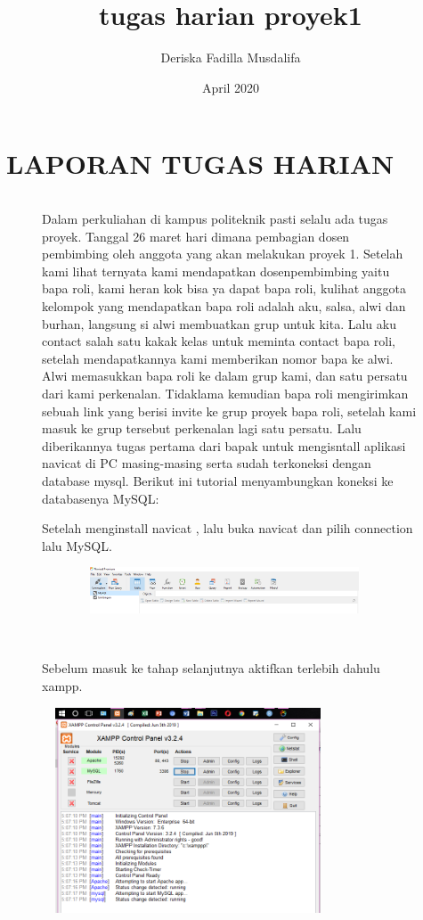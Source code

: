 \documentclass{book}
\title{tugas harian proyek1}
\author{Deriska Fadilla Musdalifa}
\date{April 2020}
\begin{document}
\maketitle
\thispagestyle{empty}

\newpage
\setcounter{page}{1}
\renewcommand{\partname}{PROYEK 1}
\part {LAPORAN TUGAS HARIAN}

\begin{enumerate}
\begin{figure} [ht]
\paragraph{} \quad Dalam perkuliahan di kampus politeknik pasti selalu ada tugas proyek. Tanggal 26 maret hari dimana pembagian dosen pembimbing oleh anggota yang akan melakukan proyek 1. Setelah kami lihat ternyata kami mendapatkan dosenpembimbing yaitu bapa roli, kami heran kok bisa ya dapat bapa roli, kulihat anggota kelompok yang mendapatkan bapa roli adalah aku, salsa, alwi dan burhan, langsung si alwi membuatkan grup untuk kita. Lalu aku contact salah satu kakak kelas untuk meminta contact bapa roli, setelah mendapatkannya kami memberikan nomor bapa ke alwi. Alwi memasukkan bapa roli ke dalam grup kami, dan satu persatu dari kami perkenalan. Tidaklama kemudian bapa roli mengirimkan sebuah link yang berisi invite ke grup proyek bapa roli, setelah kami masuk ke grup tersebut perkenalan lagi satu persatu. Lalu diberikannya tugas pertama dari bapak untuk mengisntall aplikasi navicat di PC masing-masing serta sudah terkoneksi dengan database mysql. Berikut ini tutorial menyambungkan koneksi ke databasenya MySQL:\\
    \item Setelah menginstall navicat , lalu buka navicat dan pilih connection lalu MySQL.\\
    \centerline{\includegraphics [width=10.85cm, height=1.37cm]{figures/1.png}}\\
    \item Sebelum masuk ke tahap selanjutnya aktifkan terlebih dahulu xampp.\\
    \centerline{\includegraphics [width=8.66cm, height=6.11cm]{figures/2.png}}\\

\end{figure}
\end{enumerate}
\end{document}
